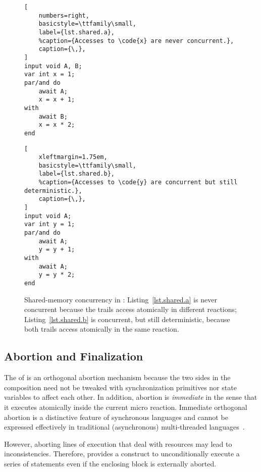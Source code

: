 \begingroup
\begin{figure}[h!]
\begin{minipage}[t]{0.45\linewidth}
\begin{lstlisting}[
    numbers=right,
    basicstyle=\ttfamily\small,
    label={lst.shared.a},
    %caption={Accesses to \code{x} are never concurrent.},
    caption={\,},
]
input void A, B;
var int x = 1;
par/and do
    await A;
    x = x + 1;
with
    await B;
    x = x * 2;
end
\end{lstlisting}
\end{minipage}%
%
\begin{minipage}[t]{0.53\linewidth}
\begin{lstlisting}[
    xleftmargin=1.75em,
    basicstyle=\ttfamily\small,
    label={lst.shared.b},
    %caption={Accesses to \code{y} are concurrent but still deterministic.},
    caption={\,},
]
input void A;
var int y = 1;
par/and do
    await A;
    y = y + 1;
with
    await A;
    y = y * 2;
end
\end{lstlisting}
\end{minipage}%
\caption{Shared-memory concurrency in \CEU:
Listing~\ref{lst.shared.a} is never concurrent because the trails access
 atomically in different reactions;
Listing~\ref{lst.shared.b} is concurrent, but still deterministic, because both
trails access  atomically in the same reaction.}
\label{lst.shared}
\end{figure}
\endgroup

\subsection{Abortion and Finalization}
\label{sec.ceu.fin}

The  of \CEU is an orthogonal abortion mechanism because the two
sides in the composition need not be tweaked with synchronization primitives nor
state variables to affect each other.
%
In addition, abortion is \emph{immediate} in the sense that it executes
atomically inside the current micro reaction.
%
Immediate orthogonal abortion is a distinctive feature of synchronous languages
and cannot be expressed effectively in traditional (asynchronous)
multi-threaded languages~\cite{esterel.preemption,sync_async.threadsstop}.

However, aborting lines of execution that deal with resources may lead to
inconsistencies.
%
Therefore, \CEU provides a  construct to unconditionally
execute a series of statements even if the enclosing block is externally
aborted.

